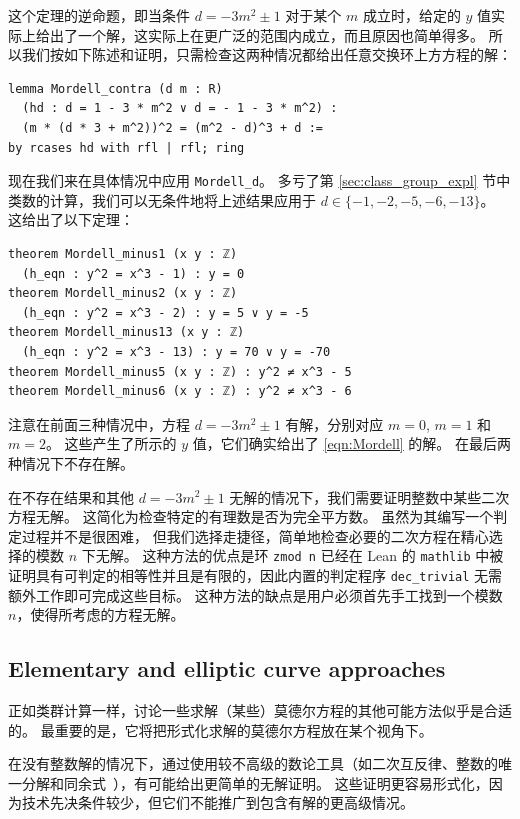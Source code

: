 \documentclass[sigplan,10pt,nonacm,
screen]{acmart} \settopmatter{printfolios=true,printccs=false,printacmref=false}
\newcommand{\mathlib}{\lstinline{mathlib}\xspace}
\begin{document}
这个定理的逆命题，即当条件 $d = -3m^2 \pm 1$ 对于某个 $m$ 成立时，给定的 $y$ 值实际上给出了一个解，这实际上在更广泛的范围内成立，而且原因也简单得多。
所以我们按如下陈述和证明，只需检查这两种情况都给出任意交换环上方方程的解：
\begin{lstlisting}
lemma Mordell_contra (d m : R)
  (hd : d = 1 - 3 * m^2 ∨ d = - 1 - 3 * m^2) :
  (m * (d * 3 + m^2))^2 = (m^2 - d)^3 + d :=
by rcases hd with rfl | rfl; ring
\end{lstlisting}

现在我们来在具体情况中应用 \lstinline{Mordell_d}。
多亏了第 \ref{sec:class_group_expl} 节中类数的计算，我们可以无条件地将上述结果应用于 $d \in \{-1,-2,-5,-6,-13\}$。
这给出了以下定理：
\begin{lstlisting}
theorem Mordell_minus1 (x y : ℤ)
  (h_eqn : y^2 = x^3 - 1) : y = 0
theorem Mordell_minus2 (x y : ℤ)
  (h_eqn : y^2 = x^3 - 2) : y = 5 ∨ y = -5
theorem Mordell_minus13 (x y : ℤ)
  (h_eqn : y^2 = x^3 - 13) : y = 70 ∨ y = -70
theorem Mordell_minus5 (x y : ℤ) : y^2 ≠ x^3 - 5
theorem Mordell_minus6 (x y : ℤ) : y^2 ≠ x^3 - 6

\end{lstlisting}

注意在前面三种情况中，方程 $d = - 3m^2 \pm 1$ 有解，分别对应 $m=0$, $m = 1$ 和 $m=2$。
这些产生了所示的 $y$ 值，它们确实给出了 \eqref{eqn:Mordell} 的解。
在最后两种情况下不存在解。

在不存在结果和其他 $d = - 3m^2 \pm 1$ 无解的情况下，我们需要证明整数中某些二次方程无解。
这简化为检查特定的有理数是否为完全平方数。
虽然为其编写一个判定过程并不是很困难，
但我们选择走捷径，简单地检查必要的二次方程在精心选择的模数 $n$ 下无解。
这种方法的优点是环 \lstinline{zmod n} 已经在 Lean 的 \mathlib 中被证明具有可判定的相等性并且是有限的，因此内置的判定程序 \lstinline{dec_trivial} 无需额外工作即可完成这些目标。
这种方法的缺点是用户必须首先手工找到一个模数 $n$，使得所考虑的方程无解。

\subsection{Elementary and elliptic curve approaches}

正如类群计算一样，讨论一些求解（某些）莫德尔方程的其他可能方法似乎是合适的。
最重要的是，它将把形式化求解的莫德尔方程放在某个视角下。

在没有整数解的情况下，通过使用较不高级的数论工具（如二次互反律、整数的唯一分解和同余式~\cite[Chapter XXIII]{dickson_history_2}），有可能给出更简单的无解证明。
这些证明更容易形式化，因为技术先决条件较少，但它们不能推广到包含有解的更高级情况。
\end{document}
